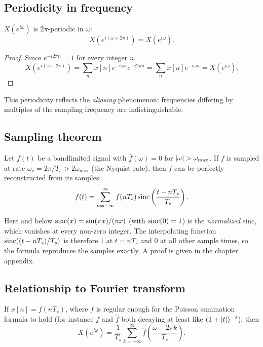 \begin{notechapter}
\subsection{Periodicity in frequency}

\begin{proposition}
$X(e^{i\omega})$ is $2\pi$-periodic in $\omega$:
\[
X(e^{i(\omega + 2\pi)}) = X(e^{i\omega}).
\]
\end{proposition}

\begin{proof}
Since $e^{-i2\pi n} = 1$ for every integer $n$,
\[
X(e^{i(\omega + 2\pi)}) = \sum_{n} x[n] e^{-i\omega n} e^{-i 2\pi n} = \sum_{n} x[n] e^{-i\omega n} = X(e^{i\omega}).
\]
\end{proof}

This periodicity reflects the \emph{aliasing} phenomenon: frequencies differing by multiples of the sampling frequency are indistinguishable.

\subsection{Sampling theorem}

\begin{theorem}
Let $f(t)$ be a bandlimited signal with $\hat{f}(\omega) = 0$ for $\left|\omega\right| > \omega_{\max}$. If $f$ is sampled at rate $\omega_s = 2\pi/T_s > 2\omega_{\max}$ (the Nyquist rate), then $f$ can be perfectly reconstructed from its samples:
\[
f(t) = \sum_{n=-\infty}^{\infty} f(nT_s) \operatorname{sinc}\left(\frac{t - nT_s}{T_s}\right).
\]
\end{theorem}

Here and below $\operatorname{sinc}(x) = \sin(\pi x)/(\pi x)$ (with $\operatorname{sinc}(0) = 1$) is the \emph{normalized} sinc, which vanishes at every non-zero integer. The interpolating function $\operatorname{sinc}((t-nT_s)/T_s)$ is therefore $1$ at $t = nT_s$ and $0$ at all other sample times, so the formula reproduces the samples exactly. A proof is given in the chapter appendix.

\subsection{Relationship to Fourier transform}

If $x[n] = f(nT_s)$, where $f$ is regular enough for the Poisson summation formula to hold (for instance $f$ and $\hat f$ both decaying at least like $(1+\left|t\right|)^{-2}$), then
\[
X(e^{i\omega}) = \frac{1}{T_s} \sum_{k=-\infty}^{\infty} \hat{f}\left(\frac{\omega - 2\pi k}{T_s}\right).
\]


\end{notechapter}
